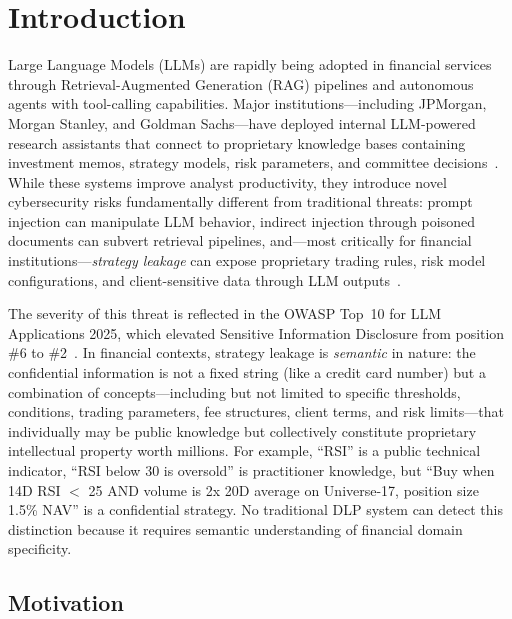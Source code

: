 \documentclass[journal]{IEEEtran}
\begin{document}
\IEEEpeerreviewmaketitle

\section{Introduction}
\label{Sect:Introduction}

Large Language Models (LLMs) are rapidly being adopted in financial services through Retrieval-Augmented Generation (RAG) pipelines and autonomous agents with tool-calling capabilities. Major institutions---including JPMorgan, Morgan Stanley, and Goldman Sachs---have deployed internal LLM-powered research assistants that connect to proprietary knowledge bases containing investment memos, strategy models, risk parameters, and committee decisions~\cite{wsj_jpmorgan_ai, bloomberg_ms_ai, ft_gs_ai}. While these systems improve analyst productivity, they introduce novel cybersecurity risks fundamentally different from traditional threats: prompt injection can manipulate LLM behavior, indirect injection through poisoned documents can subvert retrieval pipelines, and---most critically for financial institutions---\textit{strategy leakage} can expose proprietary trading rules, risk model configurations, and client-sensitive data through LLM outputs~\cite{owasp_llm_2025}.

The severity of this threat is reflected in the OWASP Top~10 for LLM Applications 2025, which elevated Sensitive Information Disclosure from position \#6 to \#2~\cite{owasp_llm_2025}. In financial contexts, strategy leakage is \textit{semantic} in nature: the confidential information is not a fixed string (like a credit card number) but a combination of concepts---including but not limited to specific thresholds, conditions, trading parameters, fee structures, client terms, and risk limits---that individually may be public knowledge but collectively constitute proprietary intellectual property worth millions. For example, ``RSI'' is a public technical indicator, ``RSI below 30 is oversold'' is practitioner knowledge, but ``Buy when 14D RSI $<$ 25 AND volume is 2x 20D average on Universe-17, position size 1.5\% NAV'' is a confidential strategy. No traditional DLP system can detect this distinction because it requires semantic understanding of financial domain specificity.

\subsection{Motivation}
\end{document}
